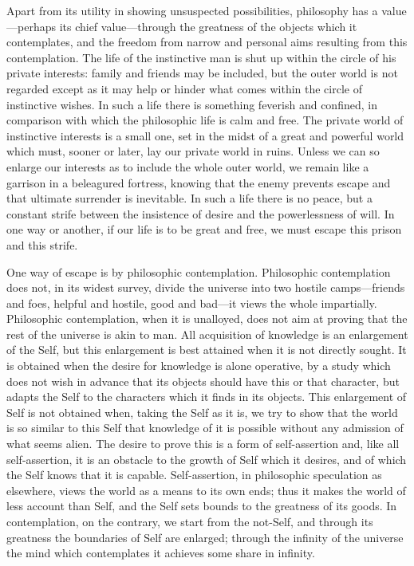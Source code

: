 \documentclass[oneside,letterpaper,12pt]{book}
\begin{document}
Apart from its utility in showing unsuspected possibilities, philosophy
has a value---perhaps its chief value---through the greatness of the
objects which it contemplates, and the freedom from narrow and personal
aims resulting from this contemplation. The life of the instinctive man
is shut up within the circle of his private interests: family and
friends may be included, but the outer world is not regarded except as
it may help or hinder what comes within the circle of instinctive
wishes. In such a life there is something feverish and confined, in
comparison with which the philosophic life is calm and free. The private
world of instinctive interests is a small one, set in the midst of a
great and powerful world which must, sooner or later, lay our private
world in ruins. Unless we can so enlarge our interests as to include the
whole outer world, we remain like a garrison in a beleagured fortress,
knowing that the enemy prevents escape and that ultimate surrender is
inevitable. In such a life there is no peace, but a constant strife
between the insistence of desire and the powerlessness of will. In one
way or another, if our life is to be great and free, we must escape this
prison and this strife.

One way of escape is by philosophic contemplation. Philosophic
contemplation does not, in its widest survey, divide the universe into
two hostile camps---friends and foes, helpful and hostile, good and
bad---it views the whole impartially. Philosophic contemplation, when it
is unalloyed, does not aim at proving that the rest of the universe is
akin to man. All acquisition of knowledge is an enlargement of the Self,
but this enlargement is best attained when it is not directly sought. It
is obtained when the desire for knowledge is alone operative, by a study
which does not wish in advance that its objects should have this or that
character, but adapts the Self to the characters which it finds in its
objects. This enlargement of Self is not obtained when, taking the Self
as it is, we try to show that the world is so similar to this Self that
knowledge of it is possible without any admission of what seems alien.
The desire to prove this is a form of self-assertion and, like all
self-assertion, it is an obstacle to the growth of Self which it
desires, and of which the Self knows that it is capable. Self-assertion,
in philosophic speculation as elsewhere, views the world as a means to
its own ends; thus it makes the world of less account than Self, and the
Self sets bounds to the greatness of its goods. In contemplation, on the
contrary, we start from the not-Self, and through its greatness the
boundaries of Self are enlarged; through the infinity of the universe
the mind which contemplates it achieves some share in infinity.
\end{document}
